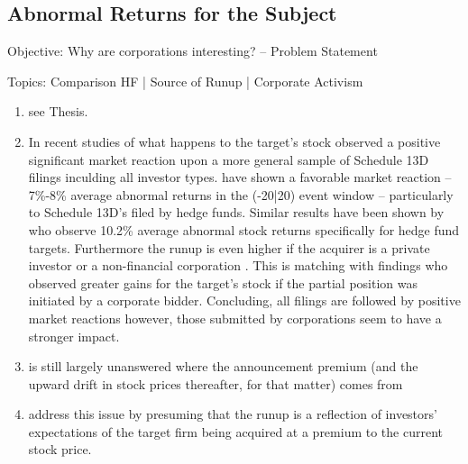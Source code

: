 \documentclass[12pt]{article}
\begin{document}
\subsection{Abnormal Returns for the Subject}
\begin{center}
Objective: Why are corporations interesting? -- Problem Statement
\end{center}
Topics: Comparison HF | Source of Runup | Corporate Activism 
    \begin{enumerate}
        \item see Thesis.
        
        \item %
        In recent studies of what happens to the target's stock  \citet{Collin-Dufresne2015} observed a positive significant market reaction upon a more general sample of Schedule 13D filings inculding all investor types. \citet{Brav2008} have shown a favorable market reaction -- 7\%-8\% average abnormal returns in the (-20|20) event window -- particularly to Schedule 13D's filed by hedge funds. Similar results have been shown by \citet{Klein2009} who observe 10.2\% average abnormal stock returns specifically for hedge fund targets.
        Furthermore the runup is even higher if the acquirer is a private investor or a non-financial corporation \citep{Brigida2012}. This is matching with \citet{Akhigbe2007} findings who observed greater gains for the target's stock if the partial position was initiated by a corporate bidder.
        Concluding, all filings are followed by positive market reactions however, those submitted by corporations seem to have a stronger impact.

        \item is still largely unanswered where the announcement premium (and the upward drift in stock prices thereafter, for that matter) comes from \citep{Greenwood2009}
        \item \citet{Greenwood2009} address this issue by presuming that the runup is a reflection of investors' expectations of the target firm being acquired at a premium to the current stock price.

    \end{enumerate}
\end{document}
